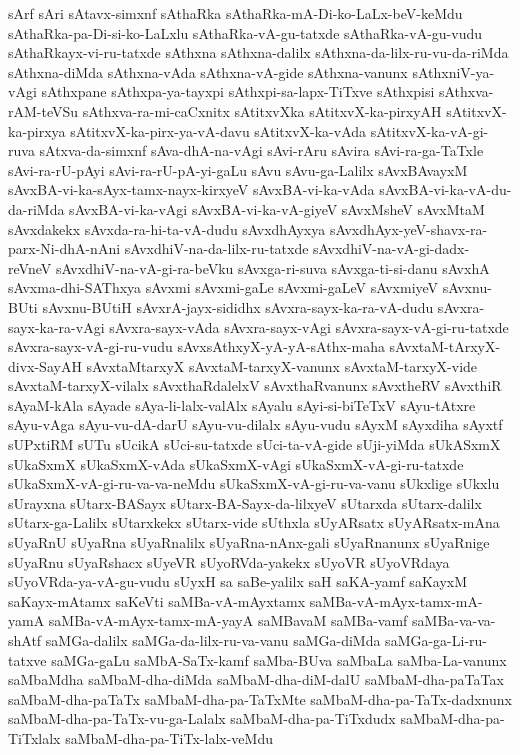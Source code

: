 {sArf
sAri
sAtavx-simxnf
sAthaRka
sAthaRka-mA-Di-ko-LaLx-beV-keMdu
sAthaRka-pa-Di-si-ko-LaLxlu
sAthaRka-vA-gu-tatxde
sAthaRka-vA-gu-vudu
sAthaRkayx-vi-ru-tatxde
sAthxna
sAthxna-dalilx
sAthxna-da-lilx-ru-vu-da-riMda
sAthxna-diMda
sAthxna-vAda
sAthxna-vA-gide
sAthxna-vanunx
sAthxniV-ya-vAgi
sAthxpane
sAthxpa-ya-tayxpi
sAthxpi-sa-lapx-TiTxve
sAthxpisi
sAthxva-rAM-teVSu
sAthxva-ra-mi-caCxnitx
sAtitxvXka
sAtitxvX-ka-pirxyAH
sAtitxvX-ka-pirxya
sAtitxvX-ka-pirx-ya-vA-davu
sAtitxvX-ka-vAda
sAtitxvX-ka-vA-gi-ruva
sAtxva-da-simxnf
sAva-dhA-na-vAgi
sAvi-rAru
sAvira
sAvi-ra-ga-TaTxle
sAvi-ra-rU-pAyi
sAvi-ra-rU-pA-yi-gaLu
sAvu
sAvu-ga-Lalilx
sAvxBAvayxM
sAvxBA-vi-ka-sAyx-tamx-nayx-kirxyeV
sAvxBA-vi-ka-vAda
sAvxBA-vi-ka-vA-du-da-riMda
sAvxBA-vi-ka-vAgi
sAvxBA-vi-ka-vA-giyeV
sAvxMsheV
sAvxMtaM
sAvxdakekx
sAvxda-ra-hi-ta-vA-dudu
sAvxdhAyxya
sAvxdhAyx-yeV-shavx-ra-parx-Ni-dhA-nAni
sAvxdhiV-na-da-lilx-ru-tatxde
sAvxdhiV-na-vA-gi-dadx-reVneV
sAvxdhiV-na-vA-gi-ra-beVku
sAvxga-ri-suva
sAvxga-ti-si-danu
sAvxhA
sAvxma-dhi-SAThxya
sAvxmi
sAvxmi-gaLe
sAvxmi-gaLeV
sAvxmiyeV
sAvxnu-BUti
sAvxnu-BUtiH
sAvxrA-jayx-sididhx
sAvxra-sayx-ka-ra-vA-dudu
sAvxra-sayx-ka-ra-vAgi
sAvxra-sayx-vAda
sAvxra-sayx-vAgi
sAvxra-sayx-vA-gi-ru-tatxde
sAvxra-sayx-vA-gi-ru-vudu
sAvxsAthxyX-yA-yA-sAthx-maha
sAvxtaM-tArxyX-divx-SayAH
sAvxtaMtarxyX
sAvxtaM-tarxyX-vanunx
sAvxtaM-tarxyX-vide
sAvxtaM-tarxyX-vilalx
sAvxthaRdalelxV
sAvxthaRvanunx
sAvxtheRV
sAvxthiR
sAyaM-kAla
sAyade
sAya-li-lalx-valAlx
sAyalu
sAyi-si-biTeTxV
sAyu-tAtxre
sAyu-vAga
sAyu-vu-dA-darU
sAyu-vu-dilalx
sAyu-vudu
sAyxM
sAyxdiha
sAyxtf
sUPxtiRM
sUTu
sUcikA
sUci-su-tatxde
sUci-ta-vA-gide
sUji-yiMda
sUkASxmX
sUkaSxmX
sUkaSxmX-vAda
sUkaSxmX-vAgi
sUkaSxmX-vA-gi-ru-tatxde
sUkaSxmX-vA-gi-ru-va-va-neMdu
sUkaSxmX-vA-gi-ru-va-vanu
sUkxlige
sUkxlu
sUrayxna
sUtarx-BASayx
sUtarx-BA-Sayx-da-lilxyeV
sUtarxda
sUtarx-dalilx
sUtarx-ga-Lalilx
sUtarxkekx
sUtarx-vide
sUthxla
sUyARsatx
sUyARsatx-mAna
sUyaRnU
sUyaRna
sUyaRnalilx
sUyaRna-nAnx-gali
sUyaRnanunx
sUyaRnige
sUyaRnu
sUyaRshacx
sUyeVR
sUyoRVda-yakekx
sUyoVR
sUyoVRdaya
sUyoVRda-ya-vA-gu-vudu
sUyxH
sa
saBe-yalilx
saH
saKA-yamf
saKayxM
saKayx-mAtamx
saKeVti
saMBa-vA-mAyxtamx
saMBa-vA-mAyx-tamx-mA-yamA
saMBa-vA-mAyx-tamx-mA-yayA
saMBavaM
saMBa-vamf
saMBa-va-va-shAtf
saMGa-dalilx
saMGa-da-lilx-ru-va-vanu
saMGa-diMda
saMGa-ga-Li-ru-tatxve
saMGa-gaLu
saMbA-SaTx-kamf
saMba-BUva
saMbaLa
saMba-La-vanunx
saMbaMdha
saMbaM-dha-diMda
saMbaM-dha-diM-dalU
saMbaM-dha-paTaTax
saMbaM-dha-paTaTx
saMbaM-dha-pa-TaTxMte
saMbaM-dha-pa-TaTx-dadxnunx
saMbaM-dha-pa-TaTx-vu-ga-Lalalx
saMbaM-dha-pa-TiTxdudx
saMbaM-dha-pa-TiTxlalx
saMbaM-dha-pa-TiTx-lalx-veMdu
}
